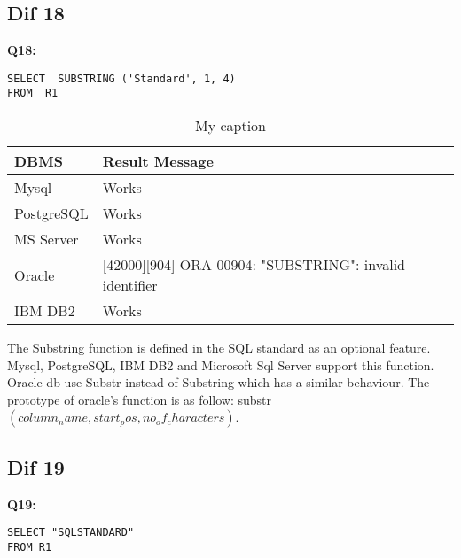 \hfill\newpage
\subsection{Dif 18}


\textbf{Q18:}
\begin{mdframed}[backgroundcolor=lightgray!20]
\begin{lstlisting}[style=SQL]
SELECT  SUBSTRING ('Standard', 1, 4)
FROM  R1
\end{lstlisting}
\end{mdframed}

\begin{table}[h]
\centering
\caption{My caption}
\label{my-label}
\begin{tabular}{|p{2cm}|p{11.5cm}| }
\hline
\textbf{DBMS} & \textbf{Result Message}                                         \\ \hline
Mysql         & Works                                                           \\ \hline
PostgreSQL    & Works                                                           \\ \hline
MS Server     & Works                                                           \\ \hline
Oracle        & {[}42000{]}{[}904{]} ORA-00904: "SUBSTRING": invalid identifier \\ \hline
IBM DB2       & Works                                                           \\ \hline
\end{tabular}
\end{table}

The Substring function is defined in the SQL standard as an optional feature. Mysql, PostgreSQL, IBM DB2 and Microsoft Sql Server support this function. Oracle db use Substr instead of Substring which has a similar behaviour. The prototype of oracle’s function is as follow: substr $(column_name, start_pos , no_of_characters)$. 


\subsection{Dif 19}

\textbf{Q19:}
\begin{mdframed}[backgroundcolor=lightgray!20]
\begin{lstlisting}[style=SQL]
SELECT "SQLSTANDARD"
FROM R1
\end{lstlisting}
\end{mdframed}


